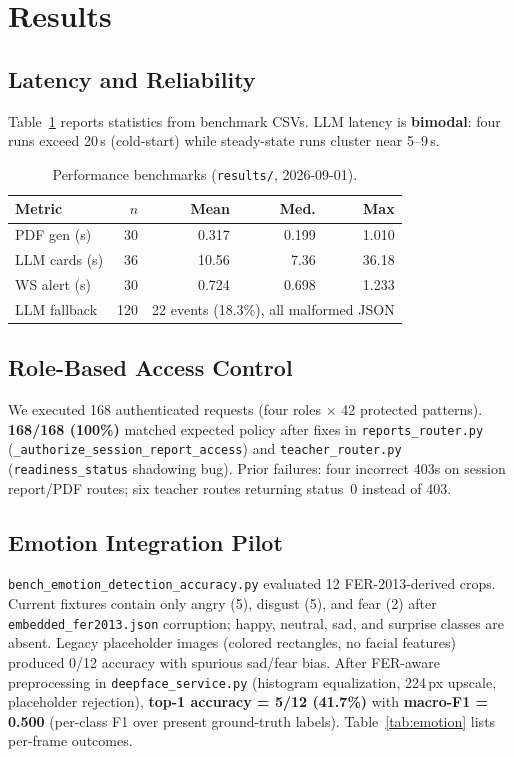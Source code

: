 \documentclass[conference]{IEEEtran}
\begin{document}
\section{Results}
\subsection{Latency and Reliability}
Table~\ref{tab:bench} reports statistics from benchmark CSVs. LLM latency is \textbf{bimodal}: four runs exceed 20\,s (cold-start) while steady-state runs cluster near 5--9\,s.

\begin{table}[!t]
\centering
\caption{Performance benchmarks (\texttt{results/}, 2026-09-01).}
\label{tab:bench}
\small
\begin{tabular}{@{}lrrrr@{}}
\toprule
\textbf{Metric} & \textbf{$n$} & \textbf{Mean} & \textbf{Med.} & \textbf{Max} \\
\midrule
PDF gen (s) & 30 & 0.317 & 0.199 & 1.010 \\
LLM cards (s) & 36 & 10.56 & 7.36 & 36.18 \\
WS alert (s) & 30 & 0.724 & 0.698 & 1.233 \\
LLM fallback & 120 & \multicolumn{3}{c}{22 events (18.3\%), all malformed JSON} \\
\bottomrule
\end{tabular}
\end{table}

\subsection{Role-Based Access Control}
\label{sec:rbac}
We executed 168 authenticated requests (four roles $\times$ 42 protected patterns). \textbf{168/168 (100\%)} matched expected policy after fixes in \texttt{reports\_router.py} (\texttt{\_authorize\_session\_report\_access}) and \texttt{teacher\_router.py} (\texttt{readiness\_status} shadowing bug). Prior failures: four incorrect 403s on session report/PDF routes; six teacher routes returning status~0 instead of 403.

\subsection{Emotion Integration Pilot}
\texttt{bench\_emotion\_detection\_accuracy.py} evaluated 12 FER-2013-derived crops. Current fixtures contain only angry (5), disgust (5), and fear (2) after \texttt{embedded\_fer2013.json} corruption; happy, neutral, sad, and surprise classes are absent. Legacy placeholder images (colored rectangles, no facial features) produced 0/12 accuracy with spurious sad/fear bias. After FER-aware preprocessing in \texttt{deepface\_service.py} (histogram equalization, 224\,px upscale, placeholder rejection), \textbf{top-1 accuracy = 5/12 (41.7\%)} with \textbf{macro-F1 = 0.500} (per-class F1 over present ground-truth labels). Table~\ref{tab:emotion} lists per-frame outcomes.
\end{document}
